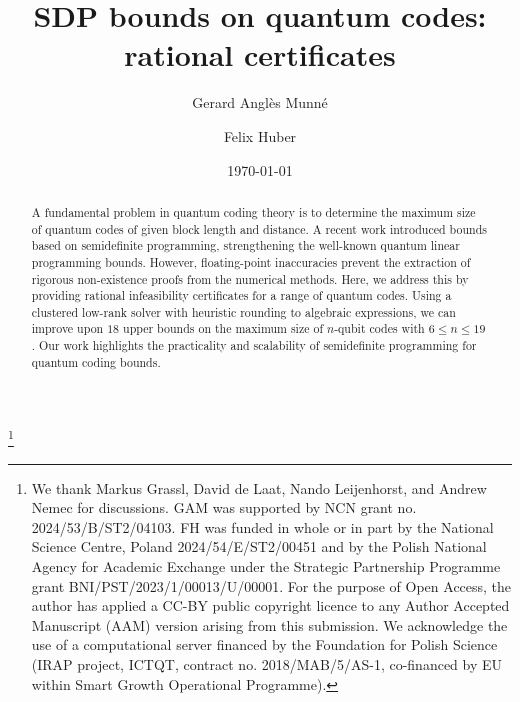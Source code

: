 \documentclass[12pt,a4paper]{amsart}
\begin{document}
\title[
SDP bounds on quantum codes: rational certificates
]{
SDP bounds on quantum codes: rational certificates}

\date{\today}

\author{Gerard Anglès Munné}
\address{
Gerard Anglès Munné,
Faculty of Mathematics, Physics and Informatics,
University of Gdańsk,
Wita Stwosza 57, 80-308 Gdańsk, Poland
}

\author{Felix Huber}
\address{
Felix Huber,
Division of Quantum Information,
Faculty of Mathematics, Physics and Informatics,
University of Gdańsk,
Wita Stwosza 57, 80-308 Gdańsk, Poland
}




\thanks{
We thank 
Markus Grassl,
David de Laat, 
Nando Leijenhorst,
and
Andrew Nemec
for discussions.
GAM was supported by NCN grant no. 2024/53/B/ST2/04103.
FH was funded in whole or in part by the National Science Centre, Poland 2024/54/E/ST2/00451
and by the Polish National Agency for Academic Exchange under the Strategic Partnership Programme grant BNI/PST/2023/1/00013/U/00001.
For the purpose of Open Access,
the author has applied a CC-BY public copyright licence to any Author Accepted Manuscript (AAM) version arising from this submission. We acknowledge the use of a computational server financed by the Foundation for Polish Science (IRAP project, ICTQT, contract no. 2018/MAB/5/AS-1, co-financed by EU within Smart Growth Operational Programme).
}


\begin{abstract}
A fundamental problem in quantum coding theory is to 
determine the maximum size of quantum codes 
of given block length and distance. 
A recent work 
introduced bounds based on semidefinite programming, strengthening the well-known quantum linear programming bounds.
However, floating-point inaccuracies prevent the extraction 
of rigorous non-existence proofs
from the numerical methods.
%
Here, we address this by providing rational infeasibility certificates for a range of quantum codes.
% 
Using a clustered low-rank solver with heuristic rounding to algebraic expressions, we can improve upon $18$ upper bounds on the maximum size of 
$n$-qubit codes with $6 \leq n \leq 19$.
%
Our work highlights the practicality and scalability 
of semidefinite programming for quantum coding bounds. 
\end{abstract}

\maketitle
\end{document}
